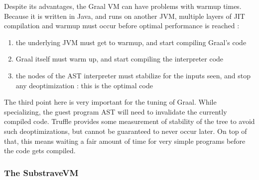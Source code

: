 \documentclass[twoside,11pt,a4paper]{article}
\begin{document}
Despite its advantages, the Graal VM can have problems with warmup times. Because it is written in Java, and runs on another JVM, multiple layers of JIT compilation and warmup must occur before optimal performance is reached :
\begin{enumerate}
\item the underlying JVM must get to warmup, and start compiling Graal's code
\item Graal itself must warm up, and start compiling the interpreter code
\item the nodes of the AST interpreter must stabilize for the inputs seen, and stop any deoptimization : this is the optimal code
\end{enumerate}


The third point here is very important for the tuning of Graal. While specializing, the guest program AST will need to invalidate the currently compiled code. Truffle provides some measurement of stability of the tree to avoid such deoptimizations, but cannot be guaranteed to never occur later. On top of that, this means waiting a fair amount of time for very simple programs before the code gets compiled.


\subsubsection{The SubstraveVM}
\end{document}
